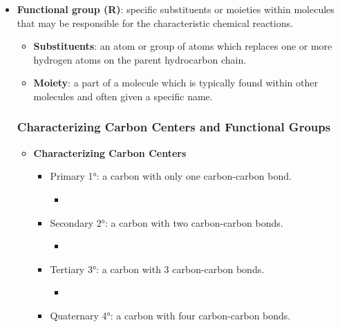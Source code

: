 \documentclass[12pt,a4paper]{article}
\begin{document}
\begin{itemize}
    \item \textbf{Functional group (R)}: specific substituents or moieties within molecules that may be responsible for the characteristic chemical reactions.
        \begin{itemize}
            \item \textbf{Substituents}: an atom or group of atoms which replaces one or more hydrogen atoms on the parent hydrocarbon chain.
            \item \textbf{Moiety}: a part of a molecule which is typically found within other molecules and often given a specific name.
        \end{itemize}
    \subsubsection{Characterizing Carbon Centers and Functional Groups}
    \begin{itemize}
        \item \textbf{Characterizing Carbon Centers}
            \begin{itemize}
                \item Primary \ang{1}: a carbon with only one carbon-carbon bond.
                    \begin{itemize}
                        \item {}\hspace{12pt}
                    \end{itemize}
                \item Secondary \ang{2}: a carbon with two carbon-carbon bonds.
                    \begin{itemize}
                        \item {}\hspace{12pt}
                    \end{itemize}
                \item Tertiary  \ang{3}: a carbon with 3 carbon-carbon bonds.
                    \begin{itemize}
                        \item {}\hspace{12pt}
                    \end{itemize}
                \item Quaternary \ang{4}: a carbon with four carbon-carbon bonds.

\end{itemize}
\end{itemize}
\end{itemize}
\end{document}
